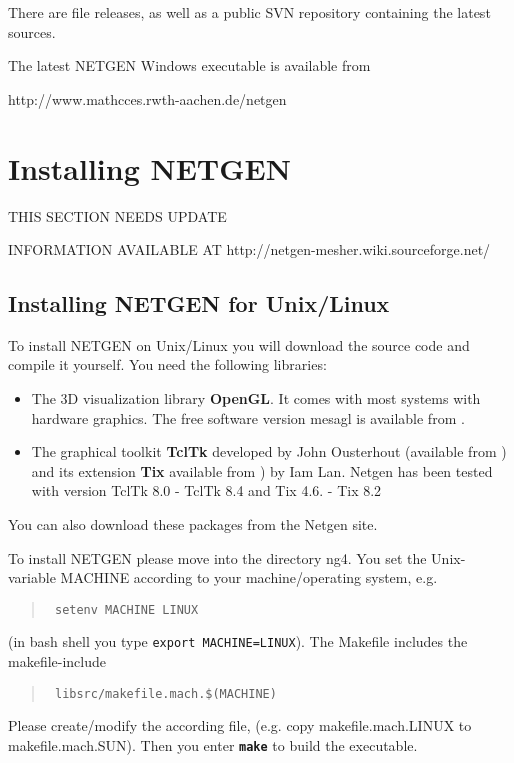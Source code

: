 \documentclass[12pt]{book}
\begin{document}
There are file releases, as well as a public SVN repository containing
the latest sources.

The latest NETGEN Windows executable is available from 
\begin{center}
http://www.mathcces.rwth-aachen.de/netgen
\end{center}

\section{Installing NETGEN}

THIS SECTION NEEDS UPDATE 

INFORMATION AVAILABLE AT http://netgen-mesher.wiki.sourceforge.net/

\subsection{Installing NETGEN for Unix/Linux}

To install NETGEN on Unix/Linux you will download the source code and
compile it yourself. You need the following libraries:

\begin{itemize}
\item
The 3D visualization library {\bf OpenGL}.
It comes with most systems with hardware graphics. The free
software version mesagl is available from
.
\item
The graphical toolkit {\bf TclTk} developed by John Ousterhout 
(available from ) and its extension {\bf Tix} available from  ) by Iam Lan. 
Netgen has been tested with version TclTk 8.0 - TclTk 8.4 and Tix 4.6. - Tix 8.2
\end{itemize}
You can also download these packages from the Netgen site.


To install NETGEN please move into the directory ng4.
You set the Unix-variable MACHINE according to
your machine/operating system, e.g.
\begin{quote}
\tt
setenv MACHINE LINUX
\end{quote}
%
(in bash shell you type {\tt export MACHINE=LINUX}).
The Makefile includes the makefile-include
\begin{quote}
\tt 
        libsrc/makefile.mach.\$(MACHINE)   
\end{quote}     
Please create/modify the according file,        
(e.g. copy makefile.mach.LINUX to makefile.mach.SUN). Then you enter 
{\bf \tt make} to build the executable. 
\end{document}
